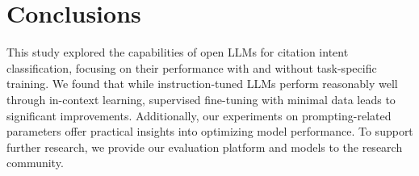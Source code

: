 \section{Conclusions}

This study explored the capabilities of open LLMs for citation intent classification, focusing on their performance with and without task-specific training. We found that while instruction-tuned LLMs perform reasonably well through in-context learning, supervised fine-tuning with minimal data leads to significant improvements. Additionally, our experiments on prompting-related parameters offer practical insights into optimizing model performance. To support further research, we provide our evaluation platform and models to the research community.